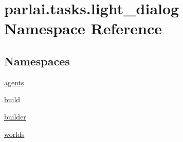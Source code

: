\hypertarget{namespaceparlai_1_1tasks_1_1light__dialog}{}\section{parlai.\+tasks.\+light\+\_\+dialog Namespace Reference}
\label{namespaceparlai_1_1tasks_1_1light__dialog}
\subsection*{Namespaces}
\begin{DoxyCompactItemize}
\item 
 \hyperlink{namespaceparlai_1_1tasks_1_1light__dialog_1_1agents}{agents}
\item 
 \hyperlink{namespaceparlai_1_1tasks_1_1light__dialog_1_1build}{build}
\item 
 \hyperlink{namespaceparlai_1_1tasks_1_1light__dialog_1_1builder}{builder}
\item 
 \hyperlink{namespaceparlai_1_1tasks_1_1light__dialog_1_1worlds}{worlds}
\end{DoxyCompactItemize}
